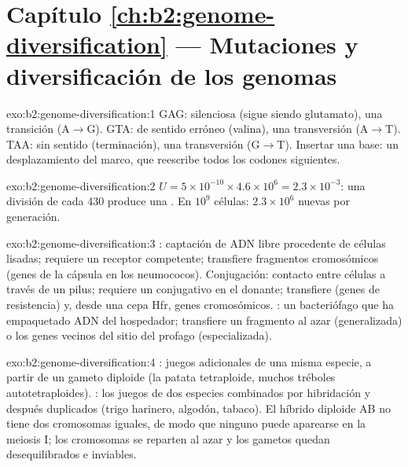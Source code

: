 \section*{Capítulo \ref{ch:b2:genome-diversification} --- Mutaciones y diversificación de los genomas}

\begin{solution}{exo:b2:genome-diversification:1}
GAG: silenciosa (sigue siendo glutamato), una transición (A$\to$G). GTA:
de sentido erróneo (valina), una transversión (A$\to$T). TAA: sin
sentido (terminación), una transversión (G$\to$T). Insertar una base:
un desplazamiento del marco, que reescribe todos los codones siguientes.
\end{solution}

\begin{solution}{exo:b2:genome-diversification:2}
$U = 5\times 10^{-10}\times 4.6\times 10^{6} = 2.3\times 10^{-3}$: una
división de cada 430 produce una . En $10^{9}$ células:
$2.3\times 10^{6}$  nuevas por generación.
\end{solution}

\begin{solution}{exo:b2:genome-diversification:3}
: captación de ADN libre procedente de células lisadas;
requiere un receptor competente; transfiere fragmentos cromosómicos
(genes de la cápsula en los neumococos). Conjugación: contacto entre
células a través de un pilus; requiere un  conjugativo en el
donante; transfiere  (genes de resistencia) y, desde una cepa
Hfr, genes cromosómicos. : un bacteriófago que ha empaquetado
ADN del hospedador; transfiere un fragmento al azar (generalizada) o los
genes vecinos del sitio del profago (especializada).
\end{solution}

\begin{solution}{exo:b2:genome-diversification:4}
: juegos adicionales de una misma especie, a partir de un
gameto diploide (la patata tetraploide, muchos tréboles
autotetraploides). : los juegos de dos especies combinados
por hibridación y después duplicados (trigo harinero, algodón, tabaco).
El híbrido diploide AB no tiene dos cromosomas iguales, de modo que
ninguno puede aparearse en la meiosis I; los cromosomas se reparten al
azar y los gametos quedan desequilibrados e inviables.
\end{solution}

